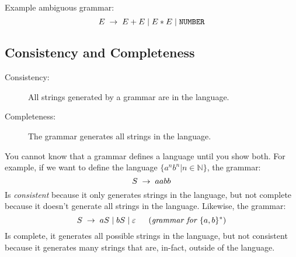 Example ambiguous grammar:
\[
    E \;\to\; E + E \;|\; E * E \;|\; \texttt{NUMBER}
\]

\subsection{Consistency and Completeness}
\begin{description}
    \item[{\small Consistency:}] All strings generated by a grammar are 
    in the language.
    \item[{\small Completeness:}] The grammar generates all strings 
    in the language.
\end{description}

You cannot know that a grammar defines a language until you show both.
For example, if we want to define the language $\{a^nb^n | n \in \mathbb{N}\}$,
the grammar:
\[
    S \;\to\; aabb
\]
Is \textit{consistent} because it only generates strings in the language,
but not complete because it doesn't generate all strings in the language.
Likewise, the grammar:
\[
    S \;\to\; aS \;|\; bS \;|\; \varepsilon 
    \;\;\quad (\textit{grammar for }\{a, b\}^*)
\]
Is complete, it generates all possible strings in the language, but not
consistent because it generates many strings that are, in-fact, outside of
the language.
